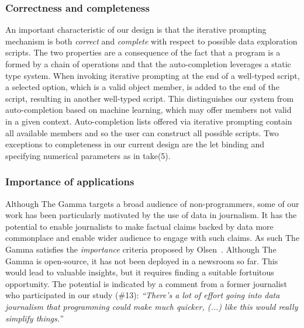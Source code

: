\documentclass[manuscript,review,anonymous]{acmart}
\newcommand{\ikvd}[1]{{\fontfamily{zi4}\selectfont\small #1}}
\begin{document}
\subsubsection*{Correctness and completeness}

An important characteristic of our design is that the iterative prompting mechanism is both \emph{correct}
and \emph{complete} with respect to possible data exploration scripts. The two properties are
a consequence of the fact that a program is a formed by a chain of operations and
that the auto-completion leverages a static type system. When invoking iterative prompting
at the end of a well-typed script, a selected option, which is a valid object member, is added to
the end of the script, resulting in another well-typed script. This distinguishes our system from
auto-completion based on machine learning, which may offer members not
valid in a given context. Auto-completion lists offered via iterative prompting contain
all available members and so the user can construct all possible scripts. Two exceptions to
completeness in our current design are the let binding and specifying numerical parameters as in
\ikvd{take(5)}.

\subsubsection*{Importance of applications}
Although The Gamma targets a broad audience of non-programmers, some of our work has been
particularly motivated by the use of data in journalism. It has the potential to enable journalists
to make factual claims backed by data more commonplace and enable wider audience to engage with
such claims. As such The Gamma satisfies the \emph{importance} criteria proposed by Olsen~\cite{evaluating}.
Although The Gamma is open-source, it has not been deployed in a newsroom so far.
This would lead to valuable insights, but it requires finding a suitable fortuitous opportunity.
The potential is indicated by a comment from a former journalist who participated in our study (\#13):
\emph{``There's a lot of effort going into data journalism that  programming could make much quicker,
  (...) like this would really simplify things.''}
\end{document}
